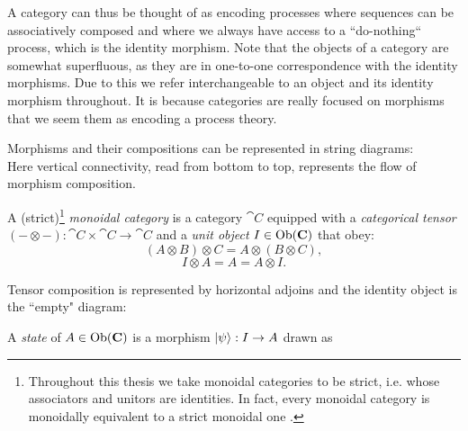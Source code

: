 
A category can thus be thought of as encoding processes where sequences can be associatively composed  and where we always have access to a ``do-nothing`` process, which is the identity morphism. Note that the objects of a category are somewhat superfluous, as they are in one-to-one correspondence with the identity morphisms. Due to this we refer interchangeable to an object and its identity morphism throughout. It is because categories are really focused on morphisms that we seem them as encoding a process theory.

Morphisms and their compositions can be represented in string diagrams:
\begin{equation}
\label{eq:composition}

\end{equation}
\noindent Here vertical connectivity, read from bottom to top, represents the flow of morphism composition.

\begin{defn}
A (strict)\footnote{Throughout this thesis we take monoidal categories to be strict, i.e. whose associators and unitors are identities.  In fact, every monoidal category is monoidally equivalent to a strict monoidal one \cite{joyal1993braided}.} \emph{monoidal category} is a category $\cat{C}$ equipped with a \emph{categorical tensor} $(-\otimes-):\cat{C}\times\cat{C}\to\cat{C}$ and a \emph{unit object} $I\in\mbox{Ob}(\mathbf{C})$ that obey:
\begin{equation}
(A\otimes B)\otimes C = A\otimes(B\otimes C),
\end{equation}
\begin{equation}
I\otimes A = A = A\otimes I.
\end{equation}
\end{defn}

Tensor composition is represented by horizontal adjoins and the identity object is the ``empty" diagram:
\begin{equation}
\label{eq:tensor}

\end{equation}

\begin{defn}
\label{defn:state}
A \emph{state} of $A\in\mbox{Ob}(\mathbf{C})$ is a morphism $| \psi \rangle:I\to A$ drawn as
\begin{equation}
\label{eq:state}

\end{equation}
\end{defn}

